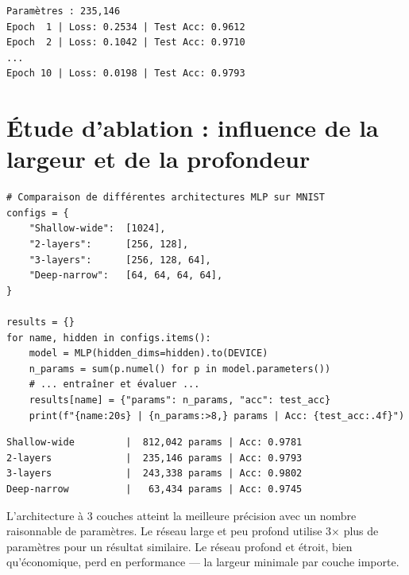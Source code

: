 \begin{codeoutput}
\begin{verbatim}
Paramètres : 235,146
Epoch  1 | Loss: 0.2534 | Test Acc: 0.9612
Epoch  2 | Loss: 0.1042 | Test Acc: 0.9710
...
Epoch 10 | Loss: 0.0198 | Test Acc: 0.9793
\end{verbatim}
\end{codeoutput}

\section{\'Etude d'ablation : influence de la largeur et de la profondeur}
\label{sec:ablation_mlp}

\begin{codeblock}[title=\textbf{\'Etude d'ablation}]
\begin{verbatim}
# Comparaison de différentes architectures MLP sur MNIST
configs = {
    "Shallow-wide":  [1024],
    "2-layers":      [256, 128],
    "3-layers":      [256, 128, 64],
    "Deep-narrow":   [64, 64, 64, 64],
}

results = {}
for name, hidden in configs.items():
    model = MLP(hidden_dims=hidden).to(DEVICE)
    n_params = sum(p.numel() for p in model.parameters())
    # ... entraîner et évaluer ...
    results[name] = {"params": n_params, "acc": test_acc}
    print(f"{name:20s} | {n_params:>8,} params | Acc: {test_acc:.4f}")
\end{verbatim}
\end{codeblock}

\begin{codeoutput}
\begin{verbatim}
Shallow-wide         |  812,042 params | Acc: 0.9781
2-layers             |  235,146 params | Acc: 0.9793
3-layers             |  243,338 params | Acc: 0.9802
Deep-narrow          |   63,434 params | Acc: 0.9745
\end{verbatim}
\end{codeoutput}

\begin{remarque}
L'architecture \`a 3 couches atteint la meilleure pr\'ecision avec un nombre raisonnable de param\`etres. Le r\'eseau large et peu profond utilise 3$\times$ plus de param\`etres pour un r\'esultat similaire. Le r\'eseau profond et \'etroit, bien qu'\'economique, perd en performance --- la largeur minimale par couche importe.
\end{remarque}

